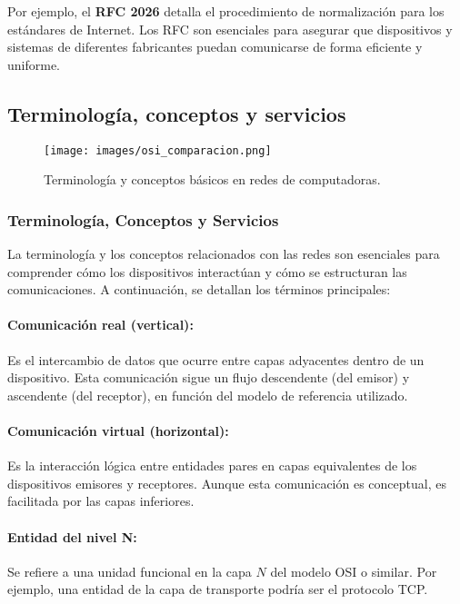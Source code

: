 \documentclass[a4paper,12pt]{article}
\begin{document}
Por ejemplo, el \textbf{RFC 2026} detalla el procedimiento de normalización para los estándares de Internet. Los RFC son esenciales para asegurar que dispositivos y sistemas de diferentes fabricantes puedan comunicarse de forma eficiente y uniforme.

\subsection{Terminología, conceptos y servicios}

\begin{figure}[H]
    \centering
    \texttt{[image: images/osi\_comparacion.png]}
    \caption{Terminología y conceptos básicos en redes de computadoras.}
    \label{fig:terminology}
\end{figure}

\subsubsection*{Terminología, Conceptos y Servicios}

La terminología y los conceptos relacionados con las redes son esenciales para comprender cómo los dispositivos interactúan y cómo se estructuran las comunicaciones. A continuación, se detallan los términos principales:

\paragraph{Comunicación real (vertical):}
Es el intercambio de datos que ocurre entre capas adyacentes dentro de un dispositivo. Esta comunicación sigue un flujo descendente (del emisor) y ascendente (del receptor), en función del modelo de referencia utilizado.

\paragraph{Comunicación virtual (horizontal):}
Es la interacción lógica entre entidades pares en capas equivalentes de los dispositivos emisores y receptores. Aunque esta comunicación es conceptual, es facilitada por las capas inferiores.

\paragraph{Entidad del nivel N:}
Se refiere a una unidad funcional en la capa \(N\) del modelo OSI o similar. Por ejemplo, una entidad de la capa de transporte podría ser el protocolo TCP.
\end{document}
